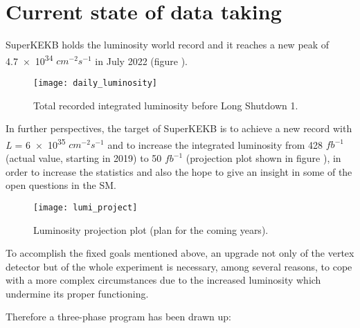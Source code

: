 \section{Current state of data taking} \label{perspectives}

SuperKEKB holds the luminosity world record and it reaches a new peak of \num{4.7e34} $cm^{-2}s^{-1}$ in July 2022 (figure ).

\begin{figure}[h!]
\centering
\texttt{[image: daily\_luminosity]}
\caption{Total recorded integrated luminosity before Long Shutdown 1.}
\label{fig:total_luminosity}
\end{figure}

In further perspectives, the target of SuperKEKB is to achieve a new record with \textit{L} = \num{6e35} $cm^{-2}s^{-1}$ and to increase the integrated luminosity from 428 $fb^{-1}$ (actual value, starting in 2019) to 50 $fb^{-1}$ (projection plot shown in figure ), in order to increase the statistics and also the hope to give an insight in some of the open questions in the SM.\\

\begin{figure}
\centering
\texttt{[image: lumi\_project]}
\caption{Luminosity projection plot (plan for the coming years).}
\label{lumy_projection}
\end{figure}

To accomplish the fixed goals mentioned above, an upgrade not only of the vertex detector but of the whole experiment is necessary, among several reasons, to cope with a more complex circumstances due to the increased luminosity which undermine its proper functioning.

Therefore a three-phase program has been drawn up:

